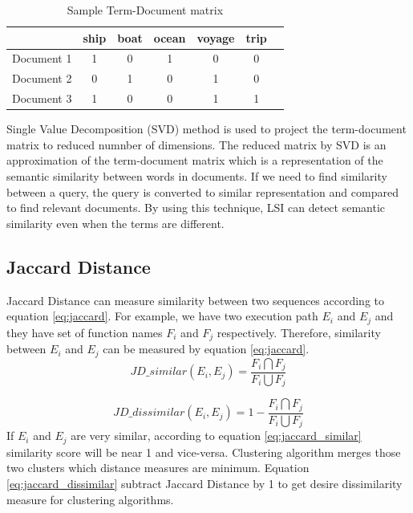 \begin{table}[h]
    \centering
    \caption{Sample Term-Document matrix}
 \begin{tabular}{|c|c|c|c|c|c|c|}
    \hline
    
        & ship & boat & ocean & voyage & trip   \\
        \hline
        Document 1 & 1 & 0 & 1 & 0 & 0  \\
        Document 2 & 0 & 1 & 0 & 1 & 0    \\
        Document 3 & 1 & 0 & 0 & 1 & 1  \\
    \hline
    \end{tabular}
    
    \label{tb:LSI_term_document}
\end{table}


Single Value Decomposition (SVD) method is used to project the term-document matrix to reduced numnber of dimensions.
The reduced matrix by SVD is an approximation of the term-document matrix which is a representation of the semantic similarity between words in documents. If we need to find similarity between a query, the query is converted to similar representation and compared to find relevant documents. By using this technique, LSI can detect semantic similarity even when the terms are different.   


\subsection{Jaccard Distance}
Jaccard Distance can measure similarity between two sequences according to equation \ref{eq:jaccard}. For example, we have two execution path $E_i$ and $E_j$ and they have set of function names $F_i$ and $F_j$ respectively. Therefore, similarity between $E_i$ and $E_j$ can be measured by equation \ref{eq:jaccard}. 
\begin{equation}
\label{eq:jaccard_similar}
    JD\_similar(E_i, E_j) =  \frac{F_i \bigcap F_j}{F_i \bigcup F_j}
\end{equation}

\begin{equation}
\label{eq:jaccard_dissimilar}
    JD\_dissimilar(E_i, E_j) =  1 - \frac{F_i \bigcap F_j}{F_i \bigcup F_j}
\end{equation}
If $E_i$ and $E_j$ are very similar, according to equation \ref{eq:jaccard_similar} similarity score will be near 1 and vice-versa. Clustering algorithm merges those two clusters which distance measures are minimum. Equation \ref{eq:jaccard_dissimilar} subtract Jaccard Distance by 1 to get desire dissimilarity measure for clustering algorithms.

